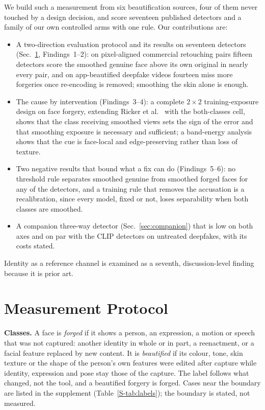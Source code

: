 \documentclass[conference]{IEEEtran}
\begin{document}
We build such a measurement from six beautification sources, four of them never touched by a design decision, and score
seventeen published detectors and a family of our own controlled arms with one rule. Our contributions are:
\begin{itemize}
\item A two-direction evaluation protocol and its results on seventeen detectors (Sec.~\ref{sec:protocol},
Findings~1--2): on pixel-aligned commercial retouching pairs fifteen detectors score the smoothed genuine face above its
own original in nearly every pair, and on app-beautified deepfake videos fourteen miss more forgeries once re-encoding is
removed; smoothing the skin alone is enough.
\item The cause by intervention (Findings~3--4): a complete $2\times2$ training-exposure design on face forgery, extending
Ricker et al.~\cite{ricker2026biasid} with the both-classes cell, shows that the class receiving smoothed views sets the
sign of the error and that smoothing exposure is necessary and sufficient; a band-energy analysis shows that the cue is
face-local and edge-preserving rather than loss of texture.
\item Two negative results that bound what a fix can do (Findings~5--6): no threshold rule separates smoothed genuine from
smoothed forged faces for any of the detectors, and a training rule that removes the accusation is a recalibration, since
every model, fixed or not, loses separability when both classes are smoothed.
\item A companion three-way detector (Sec.~\ref{sec:companion}) that is low on both axes and on par with the CLIP detectors
on untreated deepfakes, with its costs stated.
\end{itemize}
Identity as a reference channel is examined as a seventh, discussion-level finding because it is prior art.

\section{Measurement Protocol}
\label{sec:protocol}
\textbf{Classes.} A face is \emph{forged} if it shows a person, an expression, a motion or speech that was not captured:
another identity in whole or in part, a reenactment, or a facial feature replaced by new content. It is \emph{beautified} if
its colour, tone, skin texture or the shape of the person's own features were edited after capture while identity,
expression and pose stay those of the capture. The label follows what changed, not the tool, and a beautified forgery is
forged. Cases near the boundary are listed in the supplement (Table~\ref{S-tab:labels}); the boundary is stated, not
measured.
\end{document}
